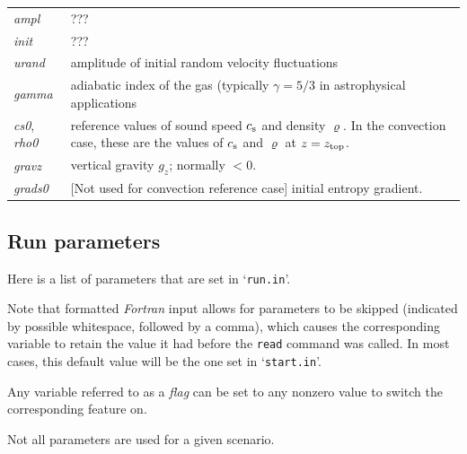 \documentclass[12pt,twoside,notitlepage,a4paper]{article}
\makeatletter
\newcommand{\code}[1]{\texttt{#1}}
\newcommand{\var}[1]{\textsl{#1}\index{#1@\emph{#1}}\/}
\newcommand{\file}[1]{`\texttt{#1}'}
\newcommand{\command}[1]{\code{#1}\index{#1}}
\newcommand{\cmd}[1]{\command{#1}}
\newcommand{\dfn}[1]{\textsl{#1}\index{#1}\/}
\newcommand{\name}[1]{\textsl{#1}\index{#1}\/}
\newcommand{\cs}            {c_{\rm s}}
\makeatother
\begin{document}
\begin{longtable}{lp{}}
  \var{ampl}   & ??? \\
  \var{init}   & ??? \\
  \var{urand}  & amplitude of initial random velocity fluctuations \\
  \var{gamma}  & adiabatic index of the gas (typically $\gamma=5/3$ in
                 astrophysical applications \\
  \var{cs0}, \var{rho0}
               & reference values of sound speed $\cs$ and density
                 $\varrho$. In the convection case, these are the values of
                 $\cs$ and $\varrho$ at $z=z_{\rm top}$. \\
  \var{gravz}  & vertical gravity $g_z$; normally $<0$. \\
  \var{grads0} & [Not used for convection reference case] initial entropy
                 gradient. \\
\bottomrule
\end{longtable}



\subsection{Run parameters}
\label{Run-params}

Here is a list of parameters that are set in \file{run.in}.

Note that formatted \name{Fortran} input allows for parameters to be
skipped (indicated by possible whitespace, followed by a comma), which
causes the corresponding variable to retain the value it had before the
\cmd{read} command was called.
In most cases, this default value will be the one set in \file{start.in}.

Any variable referred to as a \dfn{flag} can be set to any nonzero value
to switch the corresponding feature on.

Not all parameters are used for a given scenario.
\end{document}
